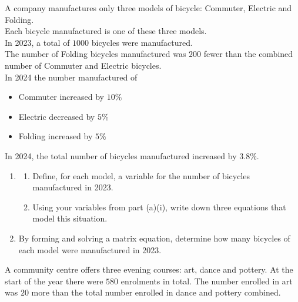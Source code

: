 \documentclass[leqno]{article}
\begin{document}
\begin{enumerate}[
  label=\textbf{\arabic*.},
  leftmargin=*,
  topsep=0pt,
  partopsep=0pt,
  parsep=0pt
]
\newpage

\questionitem

A company manufactures only three models of bicycle: Commuter, Electric and Folding. \\

Each bicycle manufactured is one of these three models. \\

In 2023, a total of $1000$ bicycles were manufactured. \\

The number of Folding bicycles manufactured was $200$ fewer than the combined number of Commuter and Electric bicycles. \\

In 2024 the number manufactured of
\begin{itemize}
\item Commuter increased by $10\%$
\item Electric decreased by $5\%$
\item Folding increased by $5\%$
\end{itemize}
In 2024, the total number of bicycles manufactured increased by $3.8\%$. \\

\begin{enumerate}[label=\textbf{(\alph*)}]
  \item
  \begin{enumerate}[label=(\roman*)]
    \item Define, for each model, a variable for the number of bicycles manufactured in 2023. 
    \item Using your variables from part (a)(i), write down three equations that model this situation. 
  \end{enumerate}
  \item By forming and solving a matrix equation, determine how many bicycles of each model were manufactured in 2023.  \\
\end{enumerate}

\newpage

\questionitem

A community centre offers three evening courses: art, dance and pottery. At the start of the year there were $580$ enrolments in total. The number enrolled in art was $20$ more than the total number enrolled in dance and pottery combined. \\


\end{enumerate}
\end{document}
